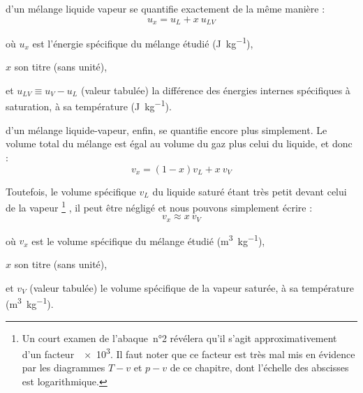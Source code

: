 \begin{description}
			\item[L’énergie interne $u$]{d’un mélange liquide vapeur se quantifie exactement de la même manière :
				\begin{equation}
					u_x = u_L + x \ u_{LV}
					\label{eq_titre_energie_interne}
				\end{equation}
				\begin{equationterms}
					\item où \tab $u_x$ 	\tab est l’énergie spécifique du mélange étudié (\si{\joule\per\kilogram}),
					\item 	\tab $x$ 	\tab son titre (sans unité),
					\item et \tab $u_{LV} \equiv u_V - u_L$ \tab (valeur tabulée) la différence des énergies internes spécifiques à saturation, à sa température (\si{\joule\per\kilogram}).
				\end{equationterms}
			} %

			\clearfloats{} %
			\item[Le volume spécifique]{d’un mélange liquide-vapeur, enfin, se quantifie encore plus simplement. Le volume total du mélange est égal au volume du gaz plus celui du liquide, et donc :
				\begin{equation*}
					v_x = (1-x) v_L + x \ v_V
				\end{equation*}

				Toutefois, le volume spécifique $v_L$ du liquide saturé étant très petit devant celui de la vapeur%
					\footnote{Un court examen de l’abaque~n°2 révélera qu’il s’agit approximativement d’un facteur~\num{e3}. Il faut noter que ce facteur est très mal mis en évidence par les diagrammes $T-v$ et $p-v$ de ce chapitre, dont l’échelle des abscisses est logarithmique.}%
				, il peut être négligé et nous pouvons simplement écrire :
				\begin{equation}
					v_x \approx x \ v_V
					\label{eq_titre_volume_specifique}
				\end{equation}
				\begin{equationterms}
					\item où \tab $v_x$ 	\tab\tab est le volume spécifique du mélange étudié (\si{\metre\cubed\per\kilogram}),
					\item 	\tab $x$ 	\tab\tab son titre (sans unité),
					\item et \tab $v_V$ 	\tab (valeur tabulée) le volume spécifique de la vapeur saturée, à sa température (\si{\metre\cubed\per\kilogram}).
				\end{equationterms}

}
\end{description}
